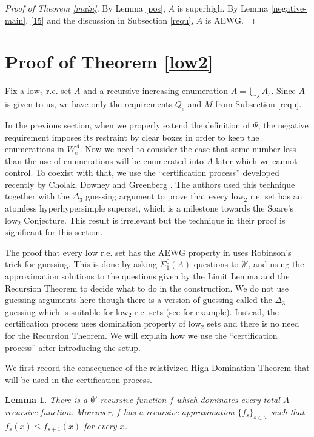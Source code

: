 \documentclass[11pt]{amsart}
\newtheorem{lemma}[theorem]{Lemma}
\begin{document}
\begin{proof}[Proof of Theorem \ref{main}]
By Lemma \ref{pos}, $A$ is superhigh.  By Lemma \ref{negative-main}, \ref{15} and the discussion in Subsection \ref{requ}, $A$ is AEWG.
\end{proof}

\section{Proof of Theorem \ref{low2}}

Fix a $\text{low}_2$ r.e.
set $A$ and a recursive increasing enumeration $A=\bigcup_s A_s$. Since $A$ is given to us, we have only 
the requirements $Q_e$ and $M$ from Subsection \ref{requ}.

In the previous section, when we properly extend the definition of $\Psi$, the negative
requirement imposes its restraint by clear boxes in order to keep the
enumerations in $W_e^A$. Now we need to consider the case that some
number less than the use of enumerations will be enumerated into $A$ later which we cannot control.
To coexist with that, we use the ``certification process'' developed recently
by Cholak, Downey and Greenberg {\cite{CDG}}. The authors used this technique together with the $\Delta_3$ guessing argument
to prove that every $\text{low}_2$ r.e. set has an atomless hyperhypersimple superset, which is a milestone towards the Soare's $\text{low}_2$ Conjecture. This result is irrelevant but the technique in their proof is significant for this section. 

The proof that every low r.e. set has the AEWG property in \cite{MR4741732} uses Robinson's trick for guessing. This is done by asking $\Sigma^{0}_1(A)$ questions to $\emptyset'$, and using the approximation solutions to the questions given by the Limit Lemma and the Recursion Theorem to decide what to do in the construction. We do not use guessing arguments here though there is a version of guessing called the $\Delta_3$ guessing which is suitable for low$_2$ r.e. sets (see \cite{CDG} for example). Instead, the certification process uses domination property of low$_2$ sets and there is no need for the Recursion Theorem. We will explain how we use the ``certification process'' after introducing the setup.

We first record the consequence of the relativized High Domination Theorem
that will be used in the certification process.

\begin{lemma}\label{low2:dominating-approximation}
There is a $\emptyset'$-recursive function $f$ which dominates every
total $A$-recursive function. Moreover, $f$ has a recursive approximation
$\{f_s\}_{s\in\omega}$ such that $f_s(x)\leq f_{s+1}(x)$
for every $x$.
\end{lemma}
\end{document}
